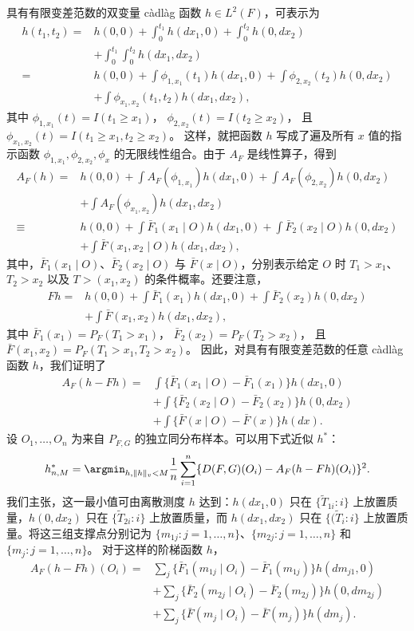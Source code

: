 具有有限变差范数的双变量 càdlàg 函数 $h\in L^2(F)$，可表示为
\[
 \begin{aligned}
 h(t_1,t_2)={}&h(0,0)+\int_0^{t_1}h(dx_1,0)
 +\int_0^{t_2}h(0,dx_2)\\
 &+\int_0^{t_1}\int_0^{t_2}h(dx_1,dx_2)\\
 ={}&h(0,0)+\int\phi_{1,x_1}(t_1)h(dx_1,0)
 +\int\phi_{2,x_2}(t_2)h(0,dx_2)\\
 &+\int\phi_{x_1,x_2}(t_1,t_2)h(dx_1,dx_2),
 \end{aligned}
\]
其中 $\phi_{1,x_1}(t)=I(t_1\geq x_1)$，
$\phi_{2,x_2}(t)=I(t_2\geq x_2)$，
且 $\phi_{x_1,x_2}(t)=I(t_1\geq x_1,t_2\geq x_2)$。
这样，就把函数 $h$ 写成了遍及所有 $x$ 值的指示函数
$\phi_{1,x_1},\phi_{2,x_2},\phi_x$
的无限线性组合。由于 $A_F$ 是线性算子，得到
\[
 \begin{aligned}
 A_F(h)={}&h(0,0)+\int A_F(\phi_{1,x_1})h(dx_1,0)
 +\int A_F(\phi_{2,x_2})h(0,dx_2)\\
 &+\int A_F(\phi_{x_1,x_2})h(dx_1,dx_2)\\
 \equiv{}&h(0,0)+\int\bar F_1(x_1\mid O)h(dx_1,0)
 +\int\bar F_2(x_2\mid O)h(0,dx_2)\\
 &+\int\bar F(x_1,x_2\mid O)h(dx_1,dx_2),
 \end{aligned}
\]
其中，$\bar F_1(x_1\mid O)$、$\bar F_2(x_2\mid O)$ 与 $\bar F(x\mid O)$，分别表示给定 $O$ 时 $T_1>x_1$、$T_2>x_2$ 以及 $T>(x_1,x_2)$ 的条件概率。还要注意，
\[
 \begin{aligned}
 Fh={}&h(0,0)+\int\bar F_1(x_1)h(dx_1,0)
 +\int\bar F_2(x_2)h(0,dx_2)\\
 &+\int\bar F(x_1,x_2)h(dx_1,dx_2),
 \end{aligned}
\]
其中 $\bar F_1(x_1)=P_F(T_1>x_1)$，
$\bar F_2(x_2)=P_F(T_2>x_2)$，
且 $\bar F(x_1,x_2)=P_F(T_1>x_1,T_2>x_2)$。
因此，对具有有限变差范数的任意 càdlàg 函数 $h$，我们证明了
\[
 \begin{aligned}
 A_F(h-Fh)={}&\int\{\bar F_1(x_1\mid O)-\bar F_1(x_1)\}h(dx_1,0)\\
 &+\int\{\bar F_2(x_2\mid O)-\bar F_2(x_2)\}h(0,dx_2)\\
 &+\int\{\bar F(x\mid O)-\bar F(x)\}h(dx).
 \end{aligned}
\]
设 $O_1,\ldots,O_n$ 为来自 $P_{F,G}$ 的独立同分布样本。可以用下式近似 $h^*$：
\[
 h_{n,M}^*=\argmin_{h,\|h\|_v<M}\frac1n\sum_{i=1}^n
 \{D(F,G)(O_i)-A_F(h-Fh)(O_i)\}^2.
\]
我们主张，这一最小值可由离散测度 $h$ 达到：$h(dx_1,0)$ 只在
$\{\widetilde T_{1i}:i\}$ 上放置质量，$h(0,dx_2)$ 只在
$\{\widetilde T_{2i}:i\}$ 上放置质量，而 $h(dx_1,dx_2)$ 只在
$\{(\widetilde T_i:i\}$ 上放置质量。将这三组支撑点分别记为
$\{m_{1j}:j=1,\ldots,n\}$、$\{m_{2j}:j=1,\ldots,n\}$ 和
$\{m_j:j=1,\ldots,n\}$。
对于这样的阶梯函数 $h$，
\[
 \begin{aligned}
 A_F(h-Fh)(O_i)={}&\sum_j\{\bar F_1(m_{1j}\mid O_i)-\bar F_1(m_{1j})\}
 h(dm_{j1},0)\\
 &+\sum_j\{\bar F_2(m_{2j}\mid O_i)-\bar F_2(m_{2j})\}h(0,dm_{2j})\\
 &+\sum_j\{\bar F(m_j\mid O_i)-\bar F(m_j)\}h(dm_j).
 \end{aligned}
\]


